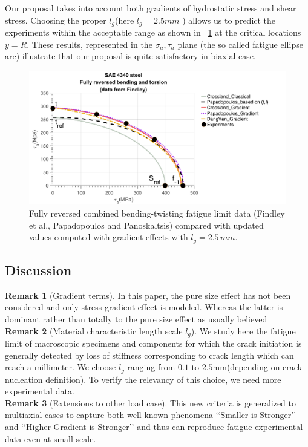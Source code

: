 \documentclass[3p,times,procedia,number]{elsarticle}
\newcommand{\figref}[1]{\figurename~\ref{#1}}
\begin{document}
Our proposal takes into account both gradients of hydrostatic stress and shear stress. Choosing the proper $l_g$(here $l_g=2.5mm$ ) allows us to predict the experiments within the acceptable range as shown in \figref{4340} at the critical locations $y=R$. These results, represented in the $\sigma_a, \tau_a$ plane (the so called fatigue ellipse arc)  illustrate that our proposal is quite satisfactory in biaxial case.	

\begin{figure}[!h]
	\includegraphics[width=\textwidth]{figures//4340.png}
	\caption{Fully reversed combined bending-twisting fatigue limit data (Findley et al.\cite{findley1956theory}, Papadopoulos and Panoskaltsis\cite{papadopoulos1996invariant}) compared with updated values computed with gradient effects with $l_g = 2.5 \, mm$.}
	\label{4340}
\end{figure}



\newpage
\subsection{Discussion}
\noindent\textbf{Remark 1} (Gradient terms). In this paper, the pure size effect has not been considered and only stress gradient effect is modeled. Whereas the latter is dominant rather than totally to the pure size effect as usually believed
\vspace{6pt} \\
\textbf{Remark 2} (Material characteristic length scale $l_g$). We study here the fatigue limit of macroscopic specimens and components for which the crack initiation is generally detected by loss of stiffness corresponding to crack length which can reach a millimeter. We choose $l_g$ ranging from $0.1$ to $2.5$mm(depending on crack nucleation definition). To verify the relevancy of this choice, we need more experimental data.
\vspace{6pt} \\
\textbf{Remark 3} (Extensions to other load case). This new criteria is generalized to multiaxial cases to capture
both well-known phenomena ‘‘Smaller is Stronger’’ and ‘‘Higher Gradient is Stronger’’ and thus can reproduce fatigue experimental data even at small scale.
\end{document}
